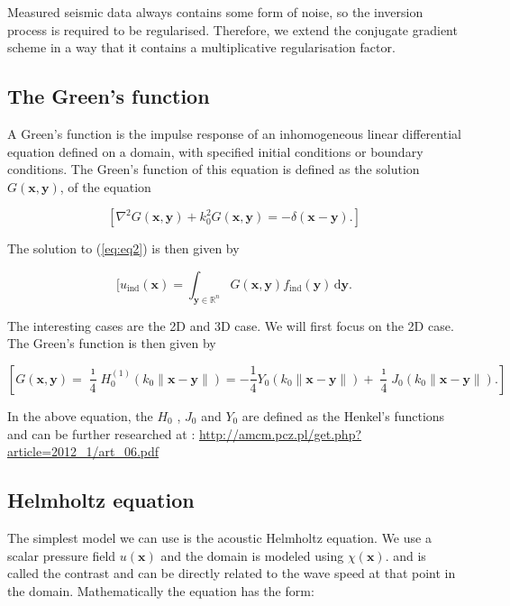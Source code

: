 \documentclass[10pt,a4paper]{article}
\newcommand{\df}[1]{\, \ensuremath{\mbox{d}#1}}
\begin{document}
Measured seismic data always contains some form of noise, so the inversion process is required to be regularised. Therefore, we extend the conjugate gradient scheme in a way that it contains a multiplicative regularisation factor. 

\subsection{The Green's function}
A Green's function is the impulse response of an inhomogeneous linear differential equation defined on a domain, with specified initial conditions or boundary conditions.
The Green's function of this equation is defined as the solution $G(\mathbf{x}, \mathbf{y})$, of the equation

\begin{equation} \label{eq:eq2}
[ \nabla^2 G(\mathbf{x}, \mathbf{y}) + k_0^2 G(\mathbf{x}, \mathbf{y}) = -\delta(\mathbf{x} - \mathbf{y}). ]\end{equation}

The solution to (\ref{eq:eq2}) is then given by 

\begin{equation} \label{eq:eq3}[ u_\text{ind}(\mathbf{x}) = \int_{\mathbf{y} \in \mathbb{R}^n} G(\mathbf{x}, \mathbf{y}) f_\text{ind}(\mathbf{y}) \df{\mathbf{y}}.\end{equation}

The interesting cases are the 2D and 3D case. We will first focus on the 2D case. The Green's function is then given by

\begin{equation} \label{eq:eq4}[ G(\mathbf{x}, \mathbf{y}) = \frac{\imath}{4} H_0^{(1)}(k_0 \|\mathbf{x} - \mathbf{y}\|) = -\frac{1}{4} Y_0(k_0 \|\mathbf{x} - \mathbf{y}\|) + \frac{\imath}{4} J_0(k_0 \|\mathbf{x} - \mathbf{y}\|).  ]\end{equation}

In the above equation, the $H_0$ , $J_0$ and $Y_0$ are defined as the Henkel's functions and can be further researched at : \url{http://amcm.pcz.pl/get.php?article=2012_1/art_06.pdf}

\subsection{Helmholtz equation}

The simplest model we can use is the acoustic Helmholtz equation. We use a scalar pressure field $u(\mathbf{x})$ and the domain is modeled using $\chi(\mathbf{x})$. and is called the contrast and can be directly related to the wave speed at that point in the domain. Mathematically the equation has the form:
\end{document}
